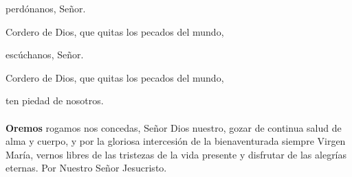 {\hspace*{\fill}}perdónanos, Señor.

Cordero de Dios, que quitas los pecados del mundo,

{\hspace*{\fill}}escúchanos, Señor.

Cordero de Dios, que quitas los pecados del mundo,

{\hspace*{\fill}}ten piedad de nosotros.\\[2mm]
\ruegapornosotrossalve\\

\textbf{Oremos}
 rogamos nos concedas, Señor Dios nuestro, gozar de continua salud de alma y cuerpo, y por la gloriosa intercesión de la
bienaventurada siempre Virgen María, vernos libres de las tristezas de la vida presente y disfrutar de las alegrías eternas.
Por Nuestro Señor Jesucristo.\\ 